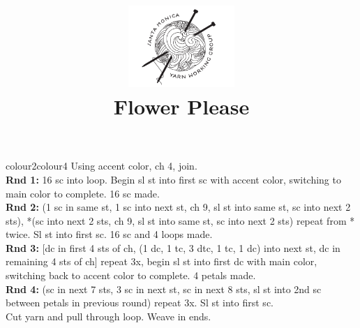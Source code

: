 \documentclass{knittingpattern}
\begin{document}
\title{\includegraphics[width=4cm]{SMYWG_FINAL.pdf}\\Flower Please}
\author{}
\date{}
\maketitle









\begin{pattern}{colour2}{colour4}
Using accent color, ch 4, join.\\
\textbf{Rnd 1:} 16 sc into loop. Begin sl st into first sc with accent color, switching to main color to complete. 16 sc made.\\
\textbf{Rnd 2:} (1 sc in same st, 1 sc into next st, ch 9, sl st into same st, sc into next 2 sts), *(sc into next 2 sts, ch 9, sl st into same st, sc into next 2 sts) repeat from * twice. Sl st into first sc. 16 sc and 4 loops made.\\
\textbf{Rnd 3:} [dc in first 4 sts of ch, (1 dc, 1 tc, 3 dtc, 1 tc, 1 dc) into next st, dc in remaining 4 sts of ch] repeat 3x, begin sl st into first dc with main color, switching back to accent color to complete. 4 petals made.\\
\textbf{Rnd 4:} (sc in next 7 sts, 3 sc in next st, sc in next 8 sts, sl st into 2nd sc between petals in previous round) repeat 3x. Sl st into first sc.\\
Cut yarn and pull through loop. Weave in ends.\\
\end{pattern}
\end{document}
